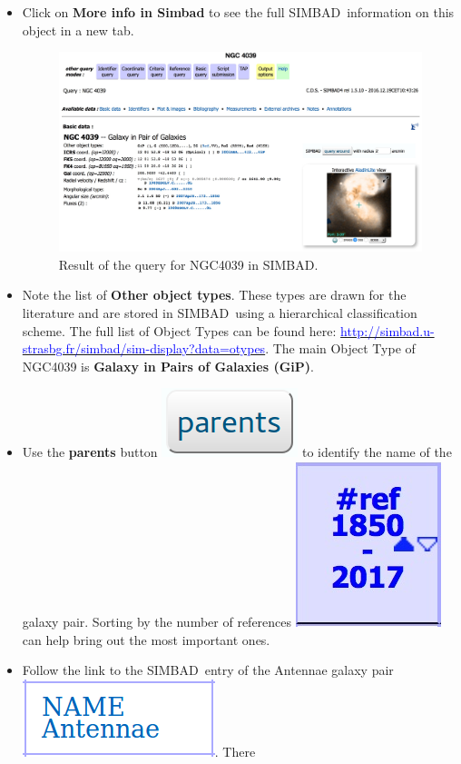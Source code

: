\documentclass [a4paper, 12pt]{article}
\newcommand{\simbad}{{\textsc{SIMBAD}}}
\begin{document}
\begin{itemize}
    \item Click on \textbf{More info in Simbad} to see the full \simbad\ 
information on this object in a new tab.
\begin{figure}[H]
    \center
    \includegraphics[width=1  
    \textwidth]{../images/simbad_section_basic-data.jpg}
    \caption{Result of the query for NGC4039 in \simbad.}
    \label{fig:simbad}
\end{figure}
    \item Note the list of \textbf{Other object types}. These types are 
drawn for the literature and are stored in \simbad\ using a 
hierarchical classification scheme. The full list of Object Types can 
be found here: 
\hyperref[http://simbad.u-strasbg.fr/simbad/sim-display?data=otypes]
{\textcolor{blue}{http://simbad.u-strasbg.fr/simbad/sim-display?data=otypes}}.
The main Object Type of NGC4039 is \textbf{Galaxy in Pairs of Galaxies 
(GiP)}.
    \item Use the {\bf parents} button \includegraphics[width=0.07 
\textwidth]{../images/simbad_button_parents.png} to identify the name 
of the galaxy pair. Sorting by the number of references 
\includegraphics[width=0.04  \textwidth]{../images/simbad_sort_references.jpg} 
can help 
bring out the most important ones. 
    \item Follow the link to the \simbad\ entry of the Antennae galaxy pair 
\includegraphics[width=0.07 
\textwidth]{../images/simbad_antennae-galaxt-pair_link.png}. There 

\end{itemize}
\end{document}
